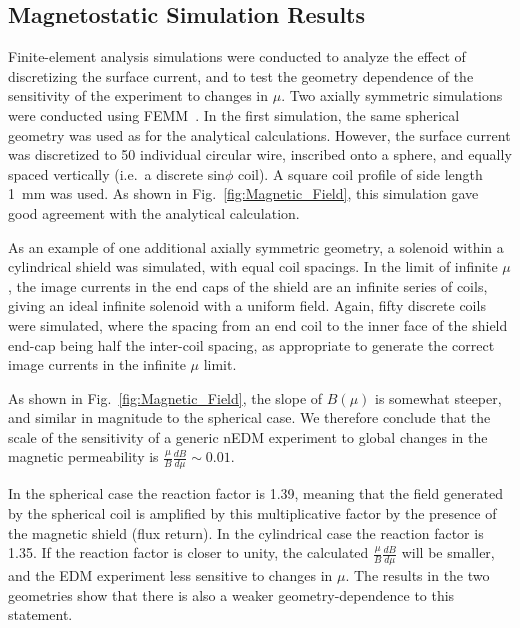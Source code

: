 \documentclass[review]{elsarticle}
\begin{document}
\subsection{Magnetostatic Simulation Results}

Finite-element analysis simulations were conducted to analyze the
effect of discretizing the surface current, and to test the geometry
dependence of the sensitivity of the experiment to changes in $\mu$.
Two axially symmetric simulations were conducted using
FEMM~\cite{bib:femm}.  In the first simulation, the same spherical geometry was
used as for the analytical calculations.  However, the surface current
was discretized to 50 individual circular wire, inscribed onto a
sphere, and equally spaced vertically (i.e.~a discrete sin$\phi$
coil).  A square coil profile of side length 1~mm was used.  As shown
in Fig.~\ref{fig:Magnetic_Field}, this simulation gave good agreement
with the analytical calculation.

As an example of one additional axially symmetric geometry, a solenoid
within a cylindrical shield was simulated, with equal coil spacings.
In the limit of infinite $\mu$, the image currents in the end caps of
the shield are an infinite series of coils, giving an ideal infinite
solenoid with a uniform field.  Again, fifty discrete coils were
simulated, where the spacing from an end coil to the inner face of the
shield end-cap being half the inter-coil spacing, as appropriate to
generate the correct image currents in the infinite $\mu$ limit. 

As shown in Fig.~\ref{fig:Magnetic_Field}, the slope of $B(\mu)$ is
somewhat steeper, and similar in magnitude to the spherical case.  We
therefore conclude that the scale of the sensitivity of a generic nEDM
experiment to global changes in the magnetic permeability is
$\frac{\mu}{B}\frac{dB}{d\mu}\sim 0.01$.

In the spherical case the reaction factor is 1.39, meaning that the
field generated by the spherical coil is amplified by this
multiplicative factor by the presence of the magnetic shield (flux
return).  In the cylindrical case the reaction factor is 1.35.  If the
reaction factor is closer to unity, the calculated
$\frac{\mu}{B}\frac{dB}{d\mu}$ will be smaller, and the EDM experiment
less sensitive to changes in $\mu$.  The results in the two geometries
show that there is also a weaker geometry-dependence to this
statement.


\end{document}
